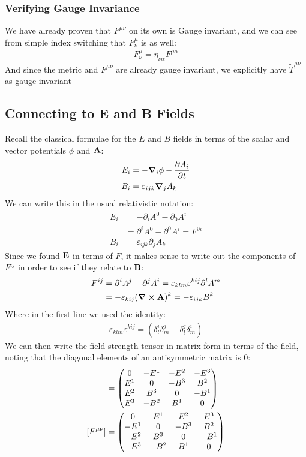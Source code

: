 \documentclass[12pt]{article}
\newcommand{\D}{\partial}
\newcommand{\veps}{\varepsilon}
\begin{document}
\subsubsection{Verifying Gauge Invariance}
We have already proven that $F^{\mu\nu}$ on its own is Gauge invariant, and we can see from simple index switching that $F^\mu_\nu$ is as well:
\begin{align*}
  F^\mu_\nu=\eta_{\nu\alpha}F^{\mu\alpha}
\end{align*}
And since the metric and $F^{\mu\nu}$ are already gauge invariant, we explicitly have $\tilde{T}^{\mu\nu}$ as gauge invariant

\subsection{Connecting to E and B Fields}
Recall the classical formulae for the $E$ and $B$ fields in terms of the scalar and vector potentials $\phi$ and $\vb{A}$:
\begin{align*}
  E_i&=-\grad_i\phi-\pdv{A_i}{t}\\
  B_i&=\veps_{ijk}\grad_jA_k
\end{align*}
We can write this in the usual relativistic notation:
\begin{align*}
  E_i&=-\D_iA^0-\D_0A^i\\
  &=\D^iA^0-\D^0A^i=F^{0i}\\
  B_i&=\veps_{ijk}\D_jA_k
\end{align*}
Since we found $\vb{E}$ in terms of $F$, it makes sense to write out the components of $F^{ij}$ in order to see if they relate to $\vb{B}$:
\begin{align*}
  F^{ij}&=\D^iA^j-\D^jA^i=\veps_{klm}\veps^{kij}\D^lA^m\\
  &=-\veps_{kij}(\curl{\vb{A}})^k=-\veps_{ijk}B^k
\end{align*}
Where in the first line we used the identity:
\begin{align*}
  \veps_{klm}\veps^{kij}=(\delta^i_l\delta^j_m-\delta^j_l\delta^i_m)
\end{align*}
We can then write the field strength tensor in matrix form in terms of the field, noting that the diagonal elements of an antisymmetric matrix is $0$:
\begin{align*}
  [F^{\mu\nu}]&=
  \pmqty{
    0  & -E^1& -E^2& -E^3\\
    E^1&  0  & -B^3&  B^2\\
    E^2&  B^3&  0  & -B^1\\
    E^3& -B^2&  B^1&  0
  }\\
  [F^{\mu\nu}]&=
  \pmqty{
     0  &  E^1&  E^2&  E^3\\
    -E^1&  0  & -B^3&  B^2\\
    -E^2&  B^3&  0  & -B^1\\
    -E^3& -B^2&  B^1&  0
  }
\end{align*}
\end{document}
